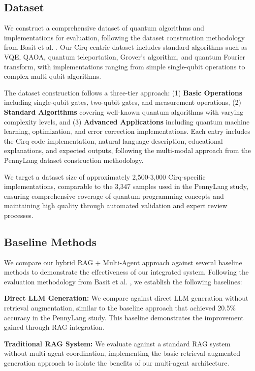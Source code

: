 \documentclass[runningheads]{llncs}
\begin{document}
\subsection{Dataset}
We construct a comprehensive dataset of quantum algorithms and implementations for evaluation, following the dataset construction methodology from Basit et al. \cite{basit2025pennylangpioneeringllmbasedquantum}. Our Cirq-centric dataset includes standard algorithms such as VQE, QAOA, quantum teleportation, Grover's algorithm, and quantum Fourier transform, with implementations ranging from simple single-qubit operations to complex multi-qubit algorithms.

The dataset construction follows a three-tier approach: (1) \textbf{Basic Operations} including single-qubit gates, two-qubit gates, and measurement operations, (2) \textbf{Standard Algorithms} covering well-known quantum algorithms with varying complexity levels, and (3) \textbf{Advanced Applications} including quantum machine learning, optimization, and error correction implementations. Each entry includes the Cirq code implementation, natural language description, educational explanations, and expected outputs, following the multi-modal approach from the PennyLang dataset construction methodology.

We target a dataset size of approximately 2,500-3,000 Cirq-specific implementations, comparable to the 3,347 samples used in the PennyLang study, ensuring comprehensive coverage of quantum programming concepts and maintaining high quality through automated validation and expert review processes.

\subsection{Baseline Methods}
We compare our hybrid RAG + Multi-Agent approach against several baseline methods to demonstrate the effectiveness of our integrated system. Following the evaluation methodology from Basit et al. \cite{basit2025pennylangpioneeringllmbasedquantum}, we establish the following baselines:

\textbf{Direct LLM Generation:} We compare against direct LLM generation without retrieval augmentation, similar to the baseline approach that achieved 20.5\% accuracy in the PennyLang study. This baseline demonstrates the improvement gained through RAG integration.

\textbf{Traditional RAG System:} We evaluate against a standard RAG system without multi-agent coordination, implementing the basic retrieval-augmented generation approach to isolate the benefits of our multi-agent architecture.
\end{document}
